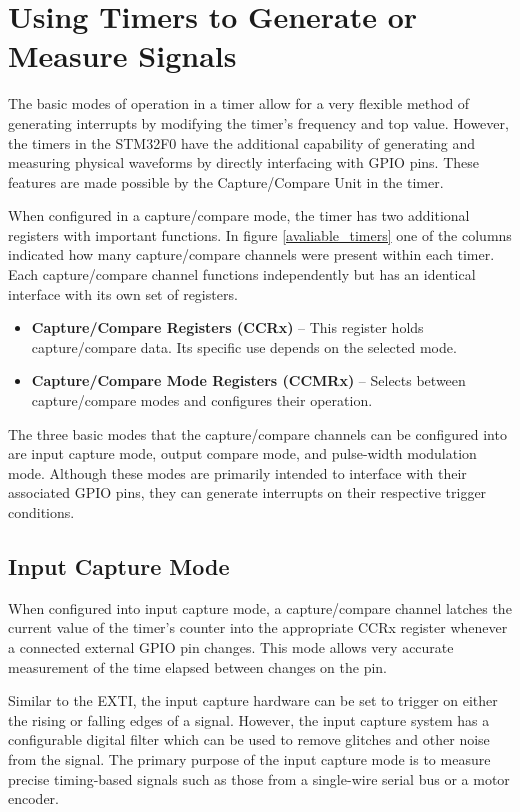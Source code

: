 \documentclass[11pt,fleqn]{book} %
\begin{document}
    

\section{Using Timers to Generate or Measure Signals}
The basic modes of operation in a timer allow for a very flexible method of generating interrupts by modifying the timer's frequency and top value. However, the timers in the STM32F0 have the additional capability of generating and measuring physical waveforms by directly interfacing with GPIO pins. These features are made possible by the Capture/Compare Unit in the timer. 

When configured in a capture/compare mode, the timer has two additional registers with important functions.  In figure \ref{avaliable_timers} one of the columns indicated how many capture/compare channels were present within each timer. Each capture/compare channel functions independently but has an identical interface with its own set of registers.  
\begin{itemize}
    \item \textbf{Capture/Compare Registers (CCRx)} -- This register holds capture/compare data. Its specific use depends on the selected mode.
    \item \textbf{Capture/Compare Mode Registers (CCMRx)} -- Selects between capture/compare modes and configures their operation.
\end{itemize}

The three basic modes that the capture/compare channels can be configured into are input capture mode, output compare mode, and pulse-width modulation mode. Although these modes are primarily intended to interface with their associated GPIO pins, they can generate interrupts on their respective trigger conditions. 			
    
    \subsection{Input Capture Mode}
    When configured into input capture mode, a capture/compare channel latches the current value of the timer's counter into the appropriate CCRx register whenever a connected external GPIO pin changes. This mode allows very accurate measurement of the time elapsed between changes on the pin. 
    
    Similar to the EXTI, the input capture hardware can be set to trigger on either the rising or falling edges of a signal. However, the input capture system has a configurable digital filter which can be used to remove glitches and other noise from the signal. The primary purpose of the input capture mode is to measure precise timing-based signals such as those from a single-wire serial bus or a motor encoder.  
\end{document}
